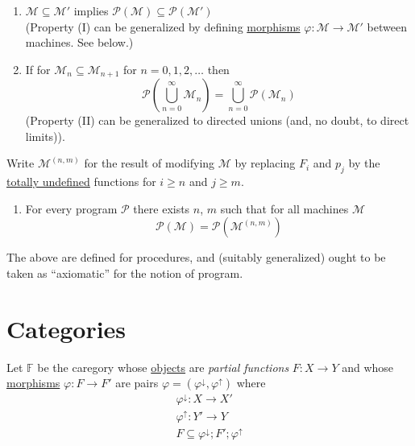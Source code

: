 \documentclass{article}
\newcommand{\scM}{\mathscr{M}}
\newcommand{\scP}{\mathscr{P}}
\newcommand{\ff}{\mathbb{F}}
\begin{document}
\begin{enumerate}[label=(\Roman*). ]
    \item $\scM \subseteq \scM'$ implies $\scP(\scM) \subseteq \scP(\scM')$ \\
            (Property (I) can be generalized by defining \underline{morphisms} $\varphi : \scM \to \scM'$ between machines. See below.) \\
        \item If for $\scM_n \subseteq \scM_{n+1}$ for $n = 0, 1, 2, \ldots$ then 
            \begin{equation*}
                \scP \left( \bigcup\limits_{n=0}^\infty \scM_n \right) = \bigcup\limits_{n=0}^\infty \scP(\scM_n)
            \end{equation*}
            (Property (II) can be generalized to directed unions (and, no doubt, to direct limits)). \\
    \end{enumerate}
     Write $\scM^{(n,m)}$ for the result of modifying $\scM$ by replacing $F_i$ and $p_j$ by the \underline{totally undefined} functions for $i \geq n$ and $j \geq m$. \\
    \begin{enumerate}[resume, label=(\Roman*). ]
        \item For every program $\scP$ there exists $n$, $m$ such that for all machines $\scM$
            \begin{equation*}
                \scP(\scM) = \scP(\scM^{(n,m)})
            \end{equation*}
\end{enumerate}

The above are defined for procedures, and (suitably generalized) ought to be taken as ``axiomatic'' for the notion of program. 

\section{Categories} 

Let $\ff$ be the caregory whose \underline{objects} are \textit{partial functions} $F: X \to Y$ and whose \underline{morphisms} $\varphi: F \to F'$ are pairs $\varphi = (\varphi^\downarrow, \varphi^\uparrow)$ where 
\begin{gather*}
    \varphi^\downarrow : X \to X' \\ 
    \varphi^\uparrow : Y' \to Y \\ 
    F \subseteq \varphi^\downarrow; F'; \varphi^\uparrow
\end{gather*}
\end{document}
